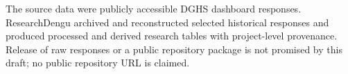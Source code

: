 The source data were publicly accessible DGHS dashboard responses. ResearchDengu archived and reconstructed selected historical responses and produced processed and derived research tables with project-level provenance. Release of raw responses or a public repository package is not promised by this draft; no public repository URL is claimed.